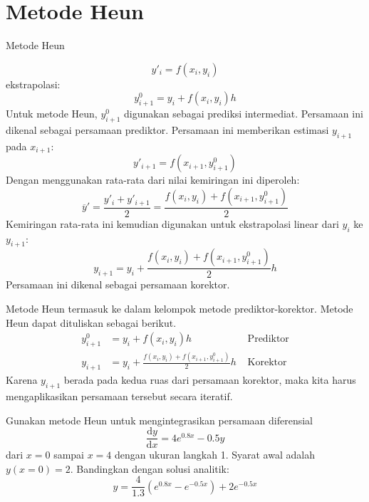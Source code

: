 \section{Metode Heun}

Metode Heun

\begin{equation*}
y'_{i} = f(x_i, y_i)
\end{equation*}
ekstrapolasi:
\begin{equation*}
y^{0}_{i+1} = y_{i} + f(x_i, y_i) h
\end{equation*}
Untuk metode Heun, $y^{0}_{i+1}$ digunakan sebagai prediksi intermediat.
Persamaan ini dikenal sebagai persamaan prediktor.
Persamaan ini memberikan estimasi $y_{i+1}$ pada $x_{i+1}$:
\begin{equation*}
y'_{i+1} = f(x_{i+1}, y^{0}_{i+1})
\end{equation*}
Dengan menggunakan rata-rata dari nilai kemiringan ini diperoleh:
\begin{equation*}
\overline{y}' = \frac{y'_{i} + y'_{i+1}}{2} = 
\frac{f(x_i, y_i) + f(x_{i+1},y^{0}_{i+1})}{2}
\end{equation*}
Kemiringan rata-rata ini kemudian digunakan untuk ekstrapolasi linear dari $y_{i}$ ke
$y_{i+1}$:
\begin{equation*}
y_{i+1} = y_{i} + \frac{f(x_i, y_i) + f(x_{i+1}, y^{0}_{i+1})}{2} h
\end{equation*}
Persamaan ini dikenal sebagai persamaan korektor.

Metode Heun termasuk ke dalam kelompok metode prediktor-korektor. Metode Heun dapat
dituliskan sebagai berikut.
\begin{align}
y^{0}_{i+1} & = y_{i} + f(x_i, y_i) h & \text{   Prediktor}\\
y_{i+1} & = y_{i} + \frac{f(x_i, y_i) + f(x_{i+1}, y^{0}_{i+1})}{2} h & \text{   Korektor}
\end{align}
Karena $y_{i+1}$ berada pada kedua ruas dari persamaan korektor, maka kita harus mengaplikasikan
persamaan tersebut secara iteratif.


\begin{soal}
Gunakan metode Heun untuk mengintegrasikan persamaan diferensial
\begin{equation*}
\frac{\mathrm{d}y}{\mathrm{d}x} = 4e^{0.8x} - 0.5y
\end{equation*}
dari $x=0$ sampai $x=4$ dengan ukuran langkah 1. Syarat awal adalah
$y(x=0) = 2$.
Bandingkan dengan solusi analitik:
\begin{equation*}
y = \frac{4}{1.3} \left( e^{0.8x} - e^{-0.5x} \right) + 2e^{-0.5x}
\end{equation*}
\end{soal}


